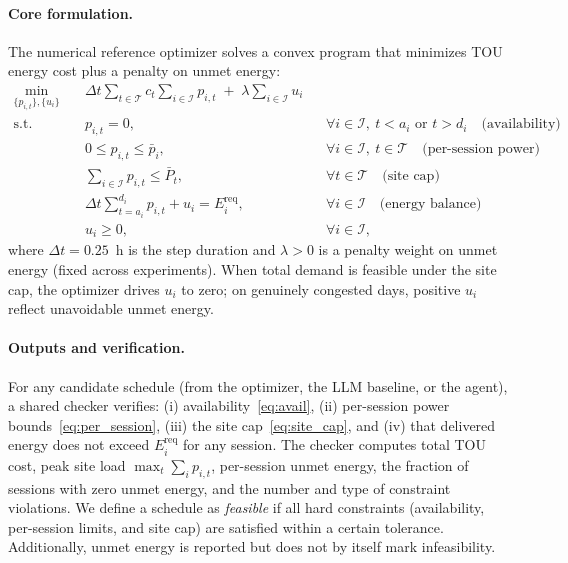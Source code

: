 \documentclass{article}
\begin{document}
\paragraph{Core formulation.}
The numerical reference optimizer solves a convex program that minimizes TOU energy cost plus a penalty on unmet energy:
\begin{align}
\min_{\{p_{i,t}\}, \{u_i\}} \quad 
  & \Delta t \sum_{t \in \mathcal{T}} c_t \sum_{i \in \mathcal{I}} p_{i,t}
  \;+\; \lambda \sum_{i \in \mathcal{I}} u_i \label{eq:obj_ev} \\
\text{s.t.}\quad
  & p_{i,t} = 0, && \forall i \in \mathcal{I},~ t < a_i \text{ or } t > d_i \quad \text{(availability)} \label{eq:avail}\\
  & 0 \le p_{i,t} \le \bar{p}_i, && \forall i \in \mathcal{I},~ t \in \mathcal{T} \quad \text{(per-session power)} \label{eq:per_session}\\
  & \sum_{i \in \mathcal{I}} p_{i,t} \le \bar{P}_t, && \forall t \in \mathcal{T} \quad \text{(site cap)} \label{eq:site_cap}\\
  & \Delta t \sum_{t = a_i}^{d_i} p_{i,t} + u_i = E_i^{\text{req}}, && \forall i \in \mathcal{I} \quad \text{(energy balance)} \label{eq:energy_bal}\\
  & u_i \ge 0, && \forall i \in \mathcal{I}, \label{eq:unmet_nonneg}
\end{align}
where $\Delta t = 0.25$~h is the step duration and $\lambda > 0$ is a penalty weight on unmet energy (fixed across experiments). When total demand is feasible under the site cap, the optimizer drives $u_i$ to zero; on genuinely congested days, positive $u_i$ reflect unavoidable unmet energy.

\paragraph{Outputs and verification.}
For any candidate schedule (from the optimizer, the LLM baseline, or the agent), a shared checker verifies: (i) availability~\eqref{eq:avail}, (ii) per-session power bounds~\eqref{eq:per_session}, (iii) the site cap~\eqref{eq:site_cap}, and (iv) that delivered energy does not exceed $E_i^{\text{req}}$ for any session. The checker computes total TOU cost, peak site load $\max_t \sum_i p_{i,t}$, per-session unmet energy, the fraction of sessions with zero unmet energy, and the number and type of constraint violations. We define a schedule as \emph{feasible} if all hard constraints (availability, per-session limits, and site cap) are satisfied within a certain tolerance. Additionally, unmet energy is reported but does not by itself mark infeasibility.
\end{document}
